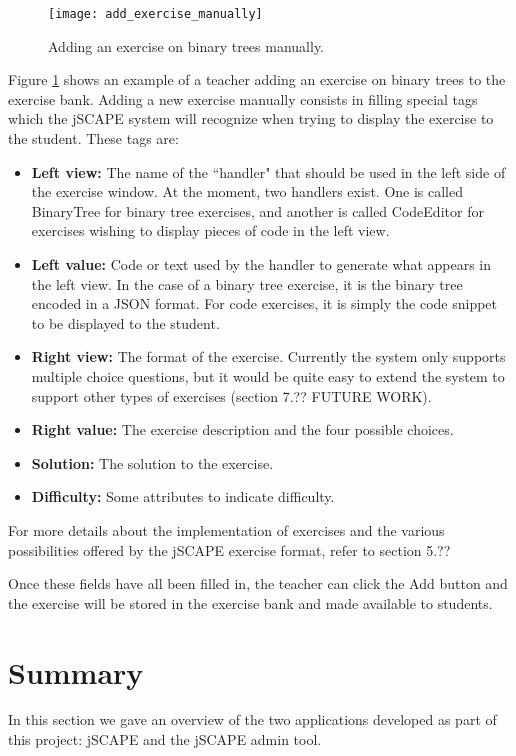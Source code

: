 \begin{figure}[H]
\centering
\texttt{[image: add\_exercise\_manually]}
\caption{Adding an exercise on binary trees manually.}
\label{fig:add_exercise_manually}
\end{figure}

Figure \ref{fig:add_exercise_manually} shows an example of a teacher adding an exercise on binary trees to the exercise bank. Adding a new exercise manually consists in filling special tags which the jSCAPE system will recognize when trying to display the exercise to the student. These tags are:
\begin{itemize}
\item \textbf{Left view:} The name of the ``handler" that should be used in the left side of the exercise window. At the moment, two handlers exist. One is called BinaryTree for binary tree exercises, and another is called CodeEditor for exercises wishing to display pieces of code in the left view.
\item \textbf{Left value:} Code or text used by the handler to generate what appears in the left view. In the case of a binary tree exercise, it is the binary tree encoded in a JSON format. For code exercises, it is simply the code snippet to be displayed to the student.
\item \textbf{Right view:} The format of the exercise. Currently the system only supports multiple choice questions, but it would be quite easy to extend the system to support other types of exercises (section 7.?? FUTURE WORK).
\item \textbf{Right value:} The exercise description and the four possible choices.
\item \textbf{Solution:} The solution to the exercise.
\item \textbf{Difficulty:} Some attributes to indicate difficulty.
\end{itemize}

For more details about the implementation of exercises and the various possibilities offered by the jSCAPE exercise format, refer to section 5.??\newline

Once these fields have all been filled in, the teacher can click the Add button and the exercise will be stored in the exercise bank and made available to students.

\section{Summary}
In this section we gave an overview of the two applications developed as part of this project: jSCAPE and the jSCAPE admin tool.\newline

